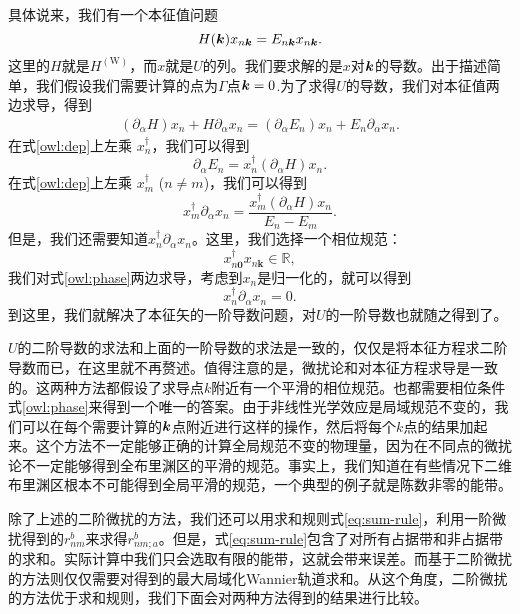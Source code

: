 具体说来，我们有一个本征值问题
\begin{equation}
H(\boldsymbol{k})x_{n\boldsymbol{k}} = E_{n\boldsymbol{k}}x_{n\boldsymbol{k}}.
\end{equation}
这里的$H$就是$H^{\mathrm{(W)}}$，而$x$就是$U$的列。我们要求解的是$x$对$\boldsymbol{k}$的导数。出于描述简单，我们假设我们需要计算的点为$\Gamma$点$\boldsymbol{k}=0$.为了求得$U$的导数，我们对本征值两边求导，得到
\begin{align}
(\partial_\alpha H) x_n+H \partial_\alpha x_n = (\partial_\alpha E_n) x_n + E_n \partial_\alpha x_n.\label{owl:dep}
\end{align}
在式\ref{owl:dep}上左乘 $x_n^\dagger$，我们可以得到
\begin{equation}
\partial_\alpha E_{n}=x_{n}^{\dagger}(\partial_\alpha H) x_{n}.
\end{equation}
在式\ref{owl:dep}上左乘 $x_m^\dagger$ ($n\ne m$)，我们可以得到
\begin{equation}
x_{m}^{\dagger}\partial_\alpha x_{n}=\frac{x_{m}^{\dagger}(\partial_\alpha H)x_{n}}{E_n-E_m}.
\end{equation}
但是，我们还需要知道$x_{n}^{\dagger}\partial_\alpha x_{n}$。这里，我们选择一个相位规范：
\begin{equation}
x_{n\boldsymbol{0}}^{\dagger} x_{n\boldsymbol{k}}\in\mathbb{R},\label{owl:phase}
\end{equation}
我们对式\ref{owl:phase}两边求导，考虑到$x_n$是归一化的，就可以得到
\begin{equation}
x_{n}^{\dagger}\partial_\alpha x_n=0.
\end{equation}
到这里，我们就解决了本征矢的一阶导数问题，对$U$的一阶导数也就随之得到了。

$U$的二阶导数的求法和上面的一阶导数的求法是一致的，仅仅是将本征方程求二阶导数而已，在这里就不再赘述。值得注意的是，微扰论和对本征方程求导是一致的。这两种方法都假设了求导点$k$附近有一个平滑的相位规范。也都需要相位条件式\ref{owl:phase}来得到一个唯一的答案。由于非线性光学效应是局域规范不变的，我们可以在每个需要计算的$\boldsymbol{k}$点附近进行这样的操作，然后将每个$k$点的结果加起来。这个方法不一定能够正确的计算全局规范不变的物理量，因为在不同点的微扰论不一定能够得到全布里渊区的平滑的规范。事实上，我们知道在有些情况下二维布里渊区根本不可能得到全局平滑的规范，一个典型的例子就是陈数非零的能带\cite{b._andrei_bernevig_topological_2013}。


除了上述的二阶微扰的方法，我们还可以用求和规则式\ref{eq:sum-rule}，利用一阶微扰得到的$r_{nm}^{b}$来求得$r_{nm;a}^{b}$。但是，式\ref{eq:sum-rule}包含了对所有占据带和非占据带的求和。实际计算中我们只会选取有限的能带，这就会带来误差。而基于二阶微扰的方法则仅仅需要对得到的最大局域化Wannier轨道求和。从这个角度，二阶微扰的方法优于求和规则，我们下面会对两种方法得到的结果进行比较。


